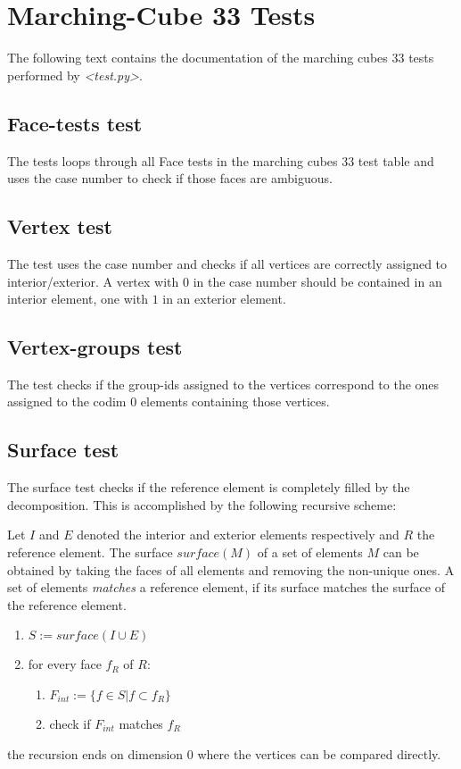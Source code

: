 \documentclass[a4paper, 11pt]{scrartcl}
\newcommand{\file}[1]{\emph{\textless #1\textgreater}}
\begin{document}
\section*{Marching-Cube 33 Tests}

The following text contains the documentation of the marching cubes 33 tests performed by \file{test.py}.
\subsection*{Face-tests test}
The tests loops through all Face tests in the marching cubes 33 test table and uses the case number to check if those faces are ambiguous.
\subsection*{Vertex test}
The test uses the case number and checks if all vertices are correctly assigned to interior/exterior. A vertex with $0$ in the case number should be contained in an interior element, one with $1$ in an exterior element.
\subsection*{Vertex-groups test}
The test checks if the group-ids assigned to the vertices correspond to the ones assigned to the codim 0 elements containing those vertices.
\subsection*{Surface test}
The surface test checks if the reference element is completely filled by the decomposition. This is accomplished by the following recursive scheme:

Let $I$ and $E$ denoted the interior and exterior elements respectively and $R$ the reference element. The surface $surface(M)$ of a set of elements $M$ can be obtained by taking the faces of all elements and removing the non-unique ones. A set of elements \emph{matches} a reference element, if its surface matches the surface of the reference element.
\begin{enumerate}
\item $S:=surface(I\cup E)$
\item for every face $f_R$ of $R$:
  \begin{enumerate}
  \item $F_{int}:=\lbrace f \in S | f\subset f_R\rbrace$
  \item check if $F_{int}$ matches $f_R$
  \end{enumerate}
\end{enumerate}
the recursion ends on dimension $0$ where the vertices can be compared directly.
\end{document}
